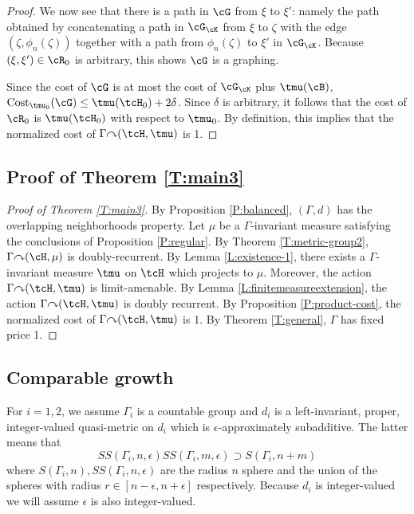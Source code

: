 \documentclass[12pt]{article}
\theoremstyle{plain}
\theoremstyle{definition}
\theoremstyle{remark}
\newcommand{\G}{\Gamma}
\newcommand{\eps}{\epsilon}
\newcommand\cost{{\operatorname{Cost}}}
\def\cc{{\curvearrowright}}
\begin{document}
\begin{proof}
We now see that there is a path in $\cG$ from $\xi$ to $\xi'$: namely the path obtained by concatenating a path in $\cG_{\cK}$ from $\xi$ to $\zeta$ with the edge $(\zeta,\phi_n(\zeta))$ together with a path from $\phi_n(\zeta)$ to $\xi'$ in $\cG_\cK$. Because $(\xi,\xi')\in \cR_0$ is arbitrary, this shows $\cG$ is a graphing.

Since the cost of $\cG$ is at most the cost of $\cG_\cK$ plus $\tmu(\cB)$, $\cost_{\tmu_0}(\cG) \le \tmu(\tcH_0)+2\delta$. Since $\delta$ is arbitrary, it follows that the cost of $\cR_0$ is $\tmu(\tcH_0)$ with respect to $\tmu_0$. By definition, this implies that the normalized cost of $\G \cc (\tcH,\tmu)$ is 1.
\end{proof}



\subsection{Proof of Theorem \ref{T:main3}}

\begin{proof}[Proof of Theorem \ref{T:main3}]

By Proposition \ref{P:balanced}, $(\G,d)$ has the overlapping neighborhoods property. Let $\mu$ be a $\G$-invariant measure satisfying the conclusions of Proposition \ref{P:regular}. By Theorem \ref{T:metric-group2},  $\G \cc (\cH,\mu)$ is doubly-recurrent. By Lemma \ref{L:existence-1}, there exists a $\G$-invariant measure $\tmu$ on $\tcH$ which projects to $\mu$. Moreover, the action $\G \cc (\tcH,\tmu)$ is limit-amenable. By Lemma \ref{L:finitemeasureextension}, the action $\G \cc (\tcH,\tmu)$ is doubly recurrent. By Proposition \ref{P:product-cost}, the normalized cost of $\G \cc (\tcH,\tmu)$ is 1. By Theorem \ref{T:general}, $\G$ has fixed price 1.
\end{proof}


\subsection{Comparable growth}


For $i=1,2$, we assume $\G_i$ is a countable group and $d_i$ is a left-invariant, proper, integer-valued quasi-metric on $d_i$ which is $\eps$-approximately subadditive. The latter means that
$$SS(\G_i,n,\eps)SS(\G_i,m,\eps) \supset S(\G_i,n+m)$$
where $S(\G_i,n), SS(\G_i,n,\eps)$ are the radius $n$ sphere and the union of the spheres with radius $r \in [n-\eps,n+\eps]$ respectively. Because $d_i$ is integer-valued we will assume $\eps$ is also integer-valued.
\end{document}
